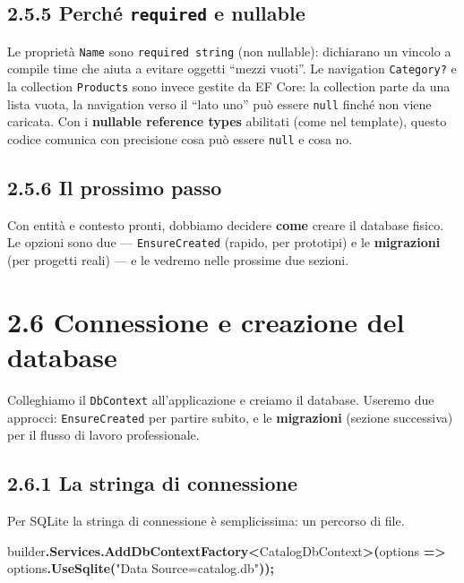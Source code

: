 \documentclass[
  italian,
  10pt,
]{book}
\newenvironment{Shaded}{\begin{snugshade}}{\end{snugshade}}
\newcommand{\FunctionTok}[1]{\textcolor[rgb]{0.13,0.29,0.53}{\textbf{#1}}}
\newcommand{\NormalTok}[1]{#1}
\newcommand{\OperatorTok}[1]{\textcolor[rgb]{0.81,0.36,0.00}{\textbf{#1}}}
\newcommand{\StringTok}[1]{\textcolor[rgb]{0.31,0.60,0.02}{#1}}
\begin{document}
\subsection{\texorpdfstring{2.5.5 Perché \texttt{required} e
nullable}{2.5.5 Perché required e nullable}}\label{perchuxe9-required-e-nullable}

Le proprietà \texttt{Name} sono \texttt{required\ string} (non
nullable): dichiarano un vincolo a compile time che aiuta a evitare
oggetti ``mezzi vuoti''. Le navigation \texttt{Category?} e la
collection \texttt{Products} sono invece gestite da EF Core: la
collection parte da una lista vuota, la navigation verso il ``lato uno''
può essere \texttt{null} finché non viene caricata. Con i
\textbf{nullable reference types} abilitati (come nel template), questo
codice comunica con precisione cosa può essere \texttt{null} e cosa no.

\subsection{2.5.6 Il prossimo passo}\label{il-prossimo-passo}

Con entità e contesto pronti, dobbiamo decidere \textbf{come} creare il
database fisico. Le opzioni sono due --- \texttt{EnsureCreated} (rapido,
per prototipi) e le \textbf{migrazioni} (per progetti reali) --- e le
vedremo nelle prossime due sezioni.

\section{2.6 Connessione e creazione del
database}\label{connessione-e-creazione-del-database}

Colleghiamo il \texttt{DbContext} all'applicazione e creiamo il
database. Useremo due approcci: \texttt{EnsureCreated} per partire
subito, e le \textbf{migrazioni} (sezione successiva) per il flusso di
lavoro professionale.

\subsection{2.6.1 La stringa di
connessione}\label{la-stringa-di-connessione}

Per SQLite la stringa di connessione è semplicissima: un percorso di
file.

\begin{Shaded}
\begin{Highlighting}[]
\NormalTok{builder}\OperatorTok{.}\FunctionTok{Services}\OperatorTok{.}\FunctionTok{AddDbContextFactory}\OperatorTok{\textless{}}\NormalTok{CatalogDbContext}\OperatorTok{\textgreater{}(}\NormalTok{options }\OperatorTok{=\textgreater{}}
\NormalTok{    options}\OperatorTok{.}\FunctionTok{UseSqlite}\OperatorTok{(}\StringTok{"Data Source=catalog.db"}\OperatorTok{));}
\end{Highlighting}
\end{Shaded}
\end{document}
